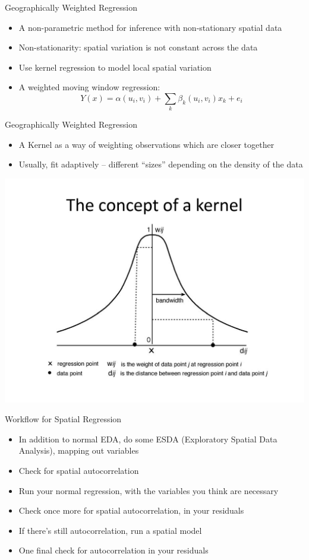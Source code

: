 \documentclass[aspectratio = 169, 12pt]{beamer}\usepackage[]{graphicx}\usepackage[]{color}
\begin{document}
\begin{frame}{Geographically Weighted Regression}
\begin{itemize}
\item A non-parametric method for inference with non-stationary spatial data
\item Non-stationarity: spatial variation is not constant across the data
\item Use kernel regression to model local spatial variation
\item A weighted moving window regression: $$ Y(x) = \alpha(u_i, v_i) + \sum_k \beta_k (u_i,v_i)x_k + e_i $$
\end{itemize}
\end{frame}
\begin{frame}{Geographically Weighted Regression}
\begin{itemize}
\item A Kernel as a way of weighting observations which are closer together
\item Usually, fit adaptively -- different ``sizes'' depending on the density of the data
\end{itemize}
\includegraphics[scale=0.15]{kernel_concept.jpg}
\end{frame}

\begin{frame}{Workflow for Spatial Regression}
\begin{itemize}
\item In addition to normal EDA, do some ESDA (Exploratory Spatial Data Analysis), mapping out variables
\item Check for spatial autocorrelation
\item Run your normal regression, with the variables you think are necessary
\item Check once more for spatial autocorrelation, in your residuals
\item If there's still autocorrelation, run a spatial model
\item One final check for autocorrelation in your residuals
\end{itemize}
\end{frame}
\end{document}
